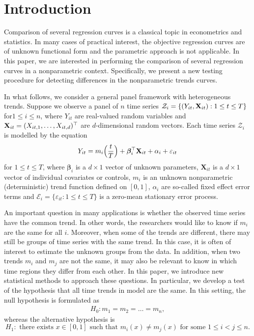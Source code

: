 \documentclass[a4paper,12pt]{article}
\makeatletter
\renewcommand{\eqref}[1]{\tagform@{\ref{#1}}}
\makeatother
\begin{document}
\vspace{-0.25cm}

\allowdisplaybreaks[1]

%

\section{Introduction}\label{sec:intro}

Comparison of several regression curves is a classical topic in econometrics and statistics. In many cases of practical interest, the objective regression curves are of unknown functional form and the parametric approach is not applicable. In this paper, we are interested in performing the comparison of several regression curves in a nonparametric context. Specifically, we present a new testing procedure for detecting differences in the nonparametric trends curves. 

In what follows, we consider a general panel framework with heterogeneous trends. Suppose we observe a panel of $n$ time series $\mathcal{Z}_i = \{ (Y_{it},\mathbf{X}_{it}): 1 \le t \le T \}$ for\linebreak $1 \le i \le n$, where $Y_{it}$ are real-valued random variables and $\mathbf{X}_{it} = (X_{it,1},\ldots,X_{it,d})^\top$ are $d$-dimensional random vectors. Each time series $\mathcal{Z}_i$ is modelled by the equation
\begin{equation}\label{eq:model}
Y_{it} = m_i \Big( \frac{t}{T} \Big) + \bm{\beta}_i^\top \mathbf{X}_{it} + \alpha_i + \varepsilon_{it}
\end{equation}
for $1 \le t \le T$, where $\bm{\beta}_i$ is a $d \times 1$ vector of unknown parameters, $\mathbf{X}_{it}$ is a $d\times 1$ vector of individual covariates or controls, $m_i$ is an unknown nonparametric (deterministic) trend function defined on $[0,1]$, $\alpha_i$ are so-called fixed effect error terms and \linebreak $\mathcal{E}_i = \{ \varepsilon_{it}: 1 \le t \le T \}$ is a zero-mean stationary error process. 


An important question in many applications is whether the observed time series have the common trend. In other words, the researchers would like to know if $m_i$ are the same for all $i$. Moreover, when some of the trends are different, there may still be groups of time series with the same trend. In this case, it is often of interest to estimate the unknown groups from the data. In addition, when two trends $m_i$ and $m_j$ are not the same, it may also be relevant to know in which time regions they differ from each other. In this paper, we introduce new statistical methods to approach these questions. In particular, we develop a test of the hypothesis that all time trends in model \eqref{eq:model} are the same. In this setting, the null hypothesis is formulated as 
\begin{align}\label{eq:null}
H_0: m_1 = m_2 = \ldots = m_n,
\end{align}
whereas the alternative hypothesis is 
$$H_1: \text{ there exists } x\in [0, 1] \text{ such that } m_i (x) \neq m_j(x) \text{ for some } 1\leq i < j \leq n.$$
\end{document}
